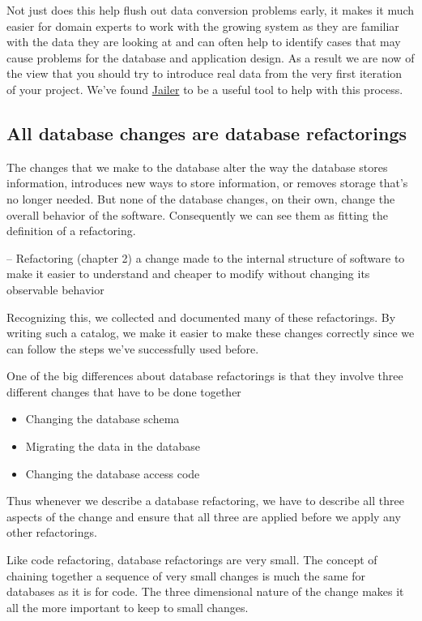 \documentclass[12pt]{article}
\begin{document}
Not just does this help flush out data conversion problems early, it
makes it much easier for domain experts to work with the growing system
as they are familiar with the data they are looking at and can often
help to identify cases that may cause problems for the database and
application design. As a result we are now of the view that you should
try to introduce real data from the very first iteration of your
project. We've found \href{http://jailer.sourceforge.net/}{Jailer} to be
a useful tool to help with this process.


\subsection{All database changes are database refactorings}

The changes that we make to the database alter the way the database
stores information, introduces new ways to store information, or removes
storage that's no longer needed. But none of the database changes, on
their own, change the overall behavior of the software. Consequently we
can see them as fitting the definition of a refactoring.

\begin{shadequote}[r]{-- Refactoring (chapter 2)}
  a change made to the internal structure of software to make it easier
  to understand and cheaper to modify without changing its observable
  behavior
\end{shadequote}

Recognizing this, we collected and documented many of these
refactorings. By writing such a catalog, we make it easier to make these
changes correctly since we can follow the steps we've successfully used
before.

One of the big differences about database refactorings is that they
involve three different changes that have to be done together

\begin{itemize}
  \item Changing the database schema
  \item Migrating the data in the database
  \item Changing the database access code
\end{itemize}

Thus whenever we describe a database refactoring, we have to describe
all three aspects of the change and ensure that all three are applied
before we apply any other refactorings.

Like code refactoring, database refactorings are very small. The concept
of chaining together a sequence of very small changes is much the same
for databases as it is for code. The three dimensional nature of the
change makes it all the more important to keep to small changes.
\end{document}
